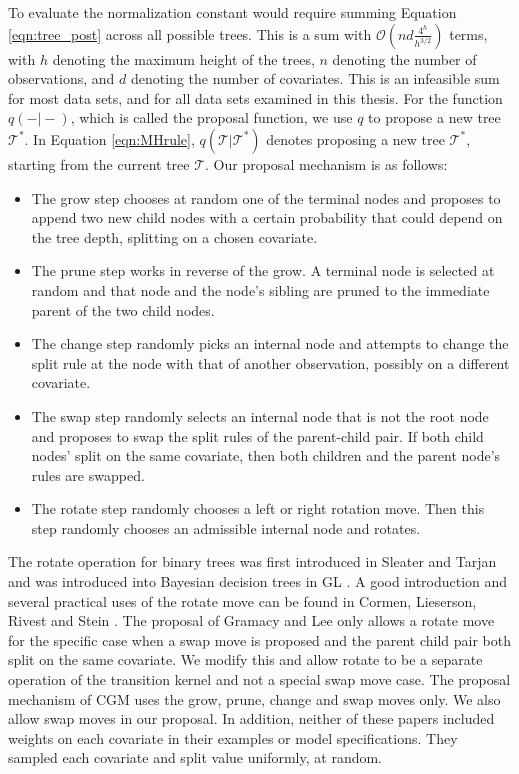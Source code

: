 To evaluate the normalization constant would require summing Equation \ref{eqn:tree_post} across all possible trees. This is a sum with $\mathcal{O}(nd\frac{4^h}{h^{3/2}})$ terms, with $h$ denoting the maximum height of the trees, $n$ denoting the number of observations, and $d$ denoting the number of covariates. This is an infeasible sum for most data sets, and for all data sets examined in this thesis. For the function $q(-\vert-)$, which is called the proposal function, we use $q$ to propose a new tree $\mathcal{T}^*$.   
In Equation \ref{eqn:MHrule}, $q(\mathcal{T}\vert\mathcal{T}^*)$ denotes proposing a new tree $\mathcal{T}^*$, starting from the current tree $\mathcal{T}$. 
 Our proposal mechanism is as follows:
  \begin{itemize}
 \item The grow step chooses at random one of the terminal nodes and proposes to append two new child nodes with a certain probability that could depend on the tree depth, splitting on a chosen covariate.
 \item The prune step works in reverse of the grow. A terminal node is selected at random and that node and the node's sibling are pruned to the immediate parent of the two child nodes.
 \item The change step randomly picks an internal node and attempts to change the split rule at the node with that of another observation, possibly on a different covariate.
  \item The swap step randomly selects an internal node that is not the root node and proposes to swap the split rules of the parent-child pair. If both child nodes' split on the same covariate, then both children and the parent node's rules are swapped.
  \item The rotate step randomly chooses a left or right rotation move. Then this step randomly chooses an admissible internal node and rotates.
 \end{itemize}
  The rotate operation for binary trees was first introduced in Sleater and Tarjan \cite{sleator1985self} and was introduced into Bayesian decision trees in GL \cite{gramacy2008bayesian}. A good introduction and several practical uses of the rotate move can be found in Cormen, Lieserson, Rivest and Stein \cite{cormen2001introduction}. The proposal of Gramacy and Lee \cite{gramacy2008bayesian} only allows a rotate move for the specific case when a swap move is proposed and the parent child pair both split on the same covariate. We modify this and allow rotate to be a separate operation of the transition kernel and not a special swap move case. The proposal mechanism of CGM uses the grow, prune, change and swap moves only. We also allow swap moves in our proposal. In addition, neither of these papers included weights on each covariate in their examples or model specifications. They sampled each covariate and split value uniformly, at random. 
  
